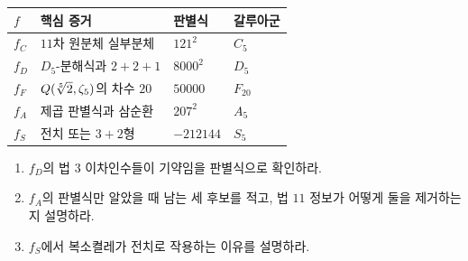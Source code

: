 \begin{center}
\renewcommand{\arraystretch}{1.2}
\begin{tabular}{llll}
\toprule
$f$ & 핵심 증거 & 판별식 & 갈루아군 \\
\midrule
$f_C$ & $11$차 원분체 실부분체 & $121^2$ & $C_5$ \\
$f_D$ & $D_5$-분해식과 $2+2+1$ & $8000^2$ & $D_5$ \\
$f_F$ & $Q(\sqrt[5]2,\zeta_5)$의 차수 $20$ & $50000$ & $F_{20}$ \\
$f_A$ & 제곱 판별식과 삼순환 & $207^2$ & $A_5$ \\
$f_S$ & 전치 또는 $3+2$형 & $-212144$ & $S_5$ \\
\bottomrule
\end{tabular}
\end{center}

\begin{checkpoint}
\begin{enumerate}[label=(\alph*)]
  \item $f_D$의 법 $3$ 이차인수들이 기약임을 판별식으로 확인하라.
  \item $f_A$의 판별식만 알았을 때 남는 세 후보를 적고, 법 $11$ 정보가 어떻게 둘을 제거하는지 설명하라.
  \item $f_S$에서 복소켤레가 전치로 작용하는 이유를 설명하라.
\end{enumerate}
\end{checkpoint}
